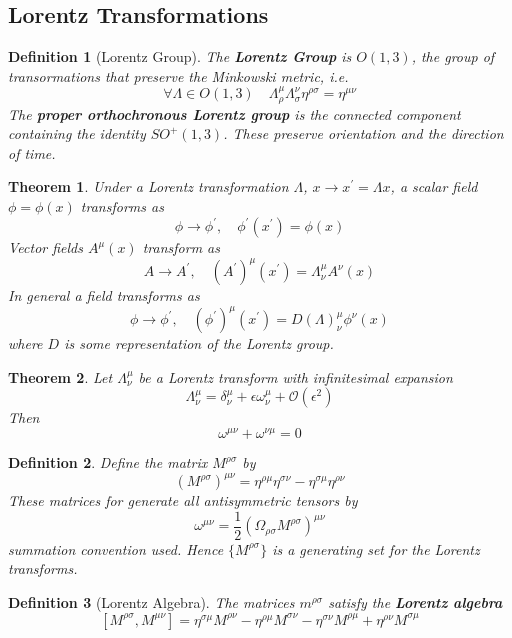 \documentclass{article}
\newtheorem{theorem}{Theorem}[subsection]
\newtheorem{definition}{Definition}[subsection]
\newcommand{\eps}{\epsilon}
\newcommand{\bam}[1]{\textbf{#1}}
\newcommand{\comm}[2][]{\left[ #1, #2 \right]} %
\newcommand{\set}[1]{\lbrace #1 \rbrace}
\begin{document}
\subsection{Lorentz Transformations}

\begin{definition}[Lorentz Group]
The \bam{Lorentz Group} is $O(1,3)$, the group of transormations that preserve the Minkowski metric, i.e.
\[
\forall \Lambda\in O(1,3) \quad \Lambda^\mu_\rho \Lambda^\nu_\sigma \eta^{\rho\sigma}=\eta^{\mu\nu}
\]
The \bam{proper orthochronous Lorentz group} is the connected component containing the identity $SO^+(1,3)$. These preserve orientation and the direction of time. 
\end{definition}

\begin{theorem}
Under a Lorentz transformation $\Lambda$, $x\to x^\prime=\Lambda x$, a scalar field $\phi=\phi(x)$ transforms as 
\[
\phi\to\phi^\prime, \quad \phi^\prime(x^\prime)=\phi(x)
\]
Vector fields $A^\mu(x)$ transform as 
\[
A\to A^\prime, \quad \left(A^\prime\right)^\mu(x^\prime)=\Lambda^\mu_\nu A^\nu (x)
\]
In general a field transforms as 
\[
\phi\to\phi^\prime, \quad (\phi^\prime)^\mu(x^\prime)=D(\Lambda)^\mu_\nu \phi^\nu(x)
\]
where $D$ is some representation of the Lorentz group. 
\end{theorem}

\begin{theorem}
Let $\Lambda^\mu_\nu$ be a Lorentz transform with infinitesimal expansion 
\[
\Lambda^\mu_\nu=\delta^\mu_\nu+\eps \omega^\mu_\nu +\mathcal{O}(\eps^2) 
\]
Then 
\[
\omega^{\mu\nu}+\omega^{\nu\mu}=0
\]
\end{theorem}

\begin{definition}
Define the matrix $M^{\rho\sigma}$ by 
\[
\left( M^{\rho\sigma} \right)^{\mu\nu} = \eta^{\rho\mu}\eta^{\sigma\nu}-\eta^{\sigma\mu}\eta^{\rho\nu}
\]
These matrices for generate all antisymmetric tensors by \[
\omega^{\mu\nu}=\frac{1}{2}\left(\Omega_{\rho\sigma}M^{\rho\sigma}\right)^{\mu\nu}
\]
summation convention used. Hence $\set{M^{\rho\sigma}}$ is a generating set for the Lorentz transforms. 
\end{definition}

\begin{definition}[Lorentz Algebra]
The matrices $m^{\rho\sigma}$ satisfy the \bam{Lorentz algebra}
\[
\comm[M^{\rho\sigma}]{M^{\mu\nu}}=\eta^{\sigma\mu}M^{\rho\nu}-\eta^{\rho\mu}M^{\sigma\nu}-\eta^{\sigma\nu}M^{\rho\mu}+\eta^{\rho\nu}M^{\sigma\mu}
\]
\end{definition}
\end{document}
